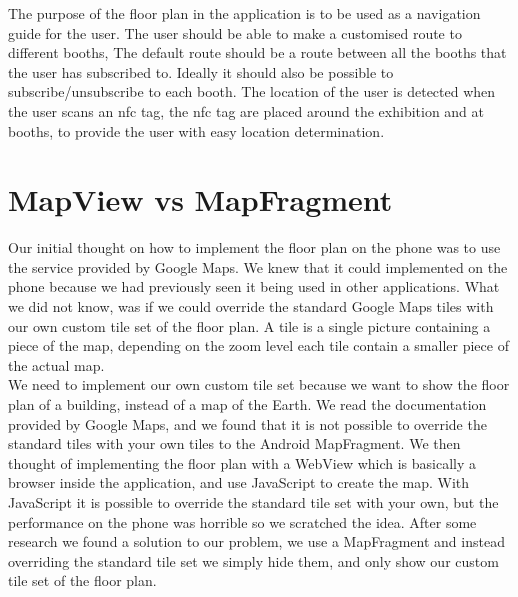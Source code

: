 The purpose of the floor plan in the application is to be used as a navigation guide for the user. The user should be able to make a customised route to different booths, The default route should be a route between all the booths that the user has subscribed to.
Ideally it should also be possible to subscribe/unsubscribe to each booth. The location of the user is detected when the user scans an \ac{nfc} tag, the \ac{nfc} tag are placed around the exhibition and at booths, to provide the user with easy location determination.

\section{MapView vs MapFragment}
Our initial thought on how to implement the floor plan on the phone was to use the service provided by Google Maps. We knew that it could implemented on the phone because we had previously seen it being used in other applications. What we did not know, was if we could override the standard Google Maps tiles with our own custom tile set of the floor plan. A tile is a single picture containing a piece of the map, depending on the zoom level each tile contain a smaller piece of the actual map.\\
We need to implement our own custom tile set because we want to show the floor plan of a building, instead of a map of the Earth. We read the documentation provided by Google Maps, and we found that it is not possible to override the standard tiles with your own tiles to the Android MapFragment. We then thought of implementing the floor plan with a WebView which is basically a browser inside the application, and use JavaScript to create the map. With JavaScript it is possible to override the standard tile set with your own, but the performance on the phone was horrible so we scratched the idea. After some research we found a solution to our problem, we use a MapFragment and instead overriding the standard tile set we simply hide them, and only show our custom tile set of the floor plan.

